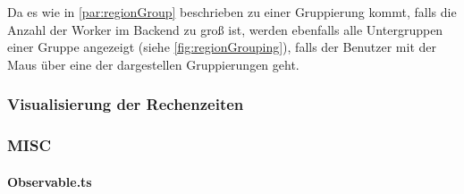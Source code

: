 Da es wie in \autoref{par:regionGroup} beschrieben zu einer Gruppierung kommt, falls die Anzahl der Worker im Backend zu
groß ist, werden ebenfalls alle Untergruppen einer Gruppe angezeigt (siehe \autoref{fig:regionGrouping}), falls der Benutzer mit der Maus über eine der 
dargestellen Gruppierungen geht.

\subsubsection{Visualisierung der Rechenzeiten} %

\subsubsection{MISC} %

\paragraph{Observable.ts}\label{par:observables}